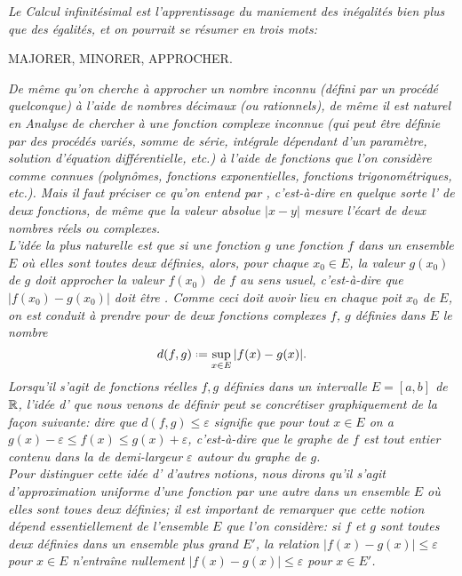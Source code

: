 
\textsl{Le Calcul infinitésimal est l'apprentissage du maniement des \emph{inégalités} bien plus que des égalités, et on pourrait se résumer en trois mots:}
\begin{center}
        MAJORER, MINORER, APPROCHER.
\end{center}
\textsl{De même qu'on cherche à \emph{approcher} un \emph{nombre} inconnu (défini par un procédé quelconque) à l'aide de nombres décimaux (ou rationnels), de même il est naturel en Analyse de chercher à  une \emph{fonction} complexe inconnue (qui peut être définie par des procédés variés, somme de série, intégrale dépendant d'un paramètre, solution d'équation différentielle, etc.) à l'aide de fonctions que l'on considère comme \emph{connues} (polynômes, fonctions exponentielles, fonctions trigonométriques, etc.). Mais il faut préciser ce qu'on entend par , c'est-à-dire  en quelque sorte l' de deux fonctions, de même que la valeur absolue $|x-y|$ mesure l'écart de deux nombres réels ou complexes. \\
L'idée la plus naturelle est que si une fonction $g$  une fonction $f$ dans un ensemble $E$ où elles sont toutes deux définies, alors, pour chaque $x_0 \in E$, la \emph{valeur} $g(x_0)$ de $g$ doit \emph{approcher} la \emph{valeur} $f(x_0)$ de $f$ au sens usuel, c'est-à-dire que $|f(x_0)-g(x_0)|$ doit être . Comme ceci doit avoir lieu en \emph{chaque} poit $x_0$ de $E$, on est conduit à prendre pour  de deux fonctions complexes $f$, $g$ définies dans $E$ le nombre
$$d(f, g) \defeq \sup_{x \in E} |f(x)-g(x)|.$$
Lorsqu'il s'agit de fonctions \emph{réelles} $f, g$ définies dans un intervalle $E = [a, b]$ de $\mathbb{R}$, l'idée d' que nous venons de définir peut se concrétiser graphiquement de la façon suivante: dire que $d(f,g) \leqslant \varepsilon$ signifie que pour tout $x \in E$ on a $g(x)-\varepsilon \leqslant f(x) \leqslant g(x) + \varepsilon$, c'est-à-dire que le graphe de $f$ est \emph{tout entier} contenu dans la  de demi-largeur $\varepsilon$ autour du graphe de $g$. \\
Pour distinguer cette idée d' d'autres notions, nous dirons qu'il s'agit d'\emph{approximation uniforme} d'une fonction par une autre dans un ensemble $E$ où elles sont toues deux définies; il est important de remarquer que cette notion \emph{dépend essentiellement} de l'ensemble $E$ que l'on considère: si $f$ et $g$ sont toutes deux définies dans un ensemble plus grand $E'$, la relation $|f(x) - g(x)| \leqslant \varepsilon$ pour $x \in E$ n'entraîne nullement $|f(x)-g(x)| \leqslant \varepsilon$ pour $x \in E'$. \\
}
